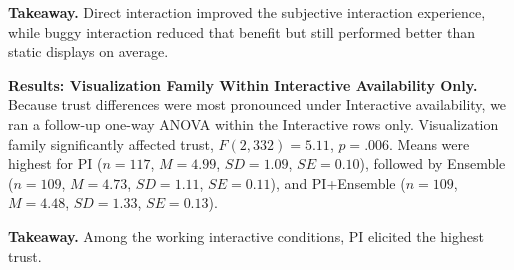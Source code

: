\noindent\textbf{Takeaway.}
Direct interaction improved the subjective interaction experience, while buggy interaction reduced that benefit but still performed better than static displays on average.

\noindent\textbf{Results: Visualization Family Within Interactive Availability Only.}
Because trust differences were most pronounced under Interactive availability, we ran a follow-up one-way ANOVA within the Interactive rows only. Visualization family significantly affected trust, $F(2, 332)=5.11$, $p=.006$. Means were highest for PI ($n=117$, $M=4.99$, $SD=1.09$, $SE=0.10$), followed by Ensemble ($n=109$, $M=4.73$, $SD=1.11$, $SE=0.11$), and PI+Ensemble ($n=109$, $M=4.48$, $SD=1.33$, $SE=0.13$).

\noindent\textbf{Takeaway.}
Among the working interactive conditions, PI elicited the highest trust.

